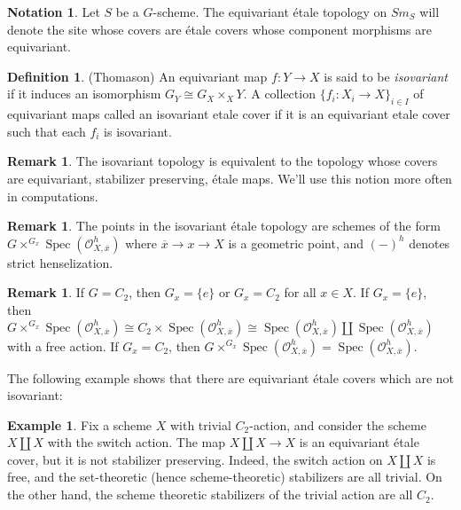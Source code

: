 \documentclass[draftthesis,tocnosub,noragright,centerchapter,10pt]{uiucthesis2009}
\newcommand{\mc}{\mathcal}
\DeclareMathOperator{\Spec}{Spec}
\theoremstyle{plain}
\theoremstyle{definition}
\newtheorem{example}[lemma]{Example}
\newtheorem{definition}[lemma]{Definition}
\newtheorem{notation}[lemma]{Notation}
\newtheorem{remark}[lemma]{Remark}
\begin{document}
\begin{notation}
Let $S$ be a  $G$-scheme. The equivariant \'etale topology on $Sm_S$
will denote the site whose covers are \'etale covers whose component
morphisms are equivariant.
\end{notation}

\begin{definition} (Thomason)
An equivariant map $f : Y \rightarrow X$ is said to be
\emph{isovariant} if it induces an isomorphism $G_Y \cong G_X \times_X
Y$. A collection $\{f_i : X_i \rightarrow X\}_{i \in I}$ of
equivariant maps called an isovariant etale cover if it is an
equivariant etale cover such that each $f_i$ is isovariant. 
\end{definition}

\begin{remark}
The isovariant topology is equivalent to the topology whose covers are
equivariant, stabilizer preserving, \'etale maps. We'll use this
notion more often in computations. 
\end{remark}

\begin{remark}
The points in the isovariant \'etale topology are schemes of the form
$G \times^{G_x} \Spec(\mc O^h_{X,\overline x})$ where $\overline x
\rightarrow x \rightarrow X$ is a geometric point, and $(-)^h$ denotes
strict henselization. 
\end{remark}

\begin{remark}
If $G = C_2$, then $G_x = \{e\}$ or $G_x = C_2$ for all $x \in X$. If
$G_x = \{e\}$, then $G \times^{G_x} \Spec(\mc O^h_{X,\overline x})
\cong C_2 \times \Spec(\mc O^h_{X,\overline x}) \cong \Spec(\mc
O^h_{X,\overline x})\coprod \Spec(\mc O^h_{X,\overline x})$ with a
free action. If $G_x = C_2$, then $G \times^{G_x} \Spec(\mc
O^h_{X,\overline x}) = \Spec(\mc
O^h_{X,\overline x})$.
\end{remark}

The following example shows that there are equivariant \'etale covers
which are not isovariant:

\begin{example}
Fix a scheme $X$ with trivial $C_2$-action, and consider the scheme $X \coprod X$ with the
switch action. The map $X \coprod X \rightarrow X$ is an equivariant
\'etale cover, but it is not stabilizer preserving. Indeed, the switch
action on $X \coprod X$ is free, and the set-theoretic (hence
scheme-theoretic) stabilizers are all trivial. On the other hand, the
scheme theoretic stabilizers of the trivial action are all $C_2$.
\end{example}
\end{document}

